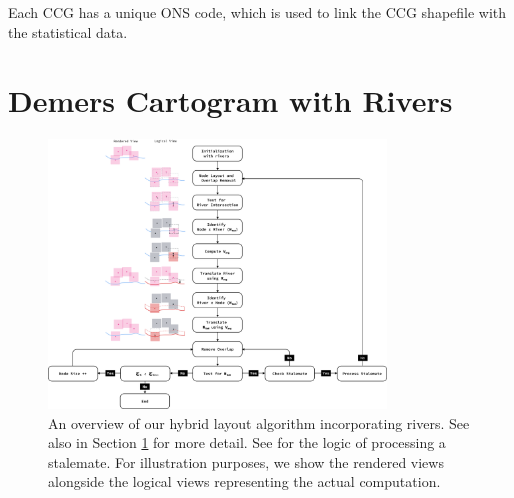 \documentclass[Afour,sagev,times]{sagej}
\begin{document}
Each CCG has a unique ONS code, which is used to link the CCG shapefile with the statistical data.

\section{Demers Cartogram with Rivers}
\label{sec:main}

{
    \begin{figure}[tb!]
        \centering
        \includegraphics[width=0.8\textwidth,height=\textheight,keepaspectratio]{flowchart.png}
        \caption{An overview of our hybrid layout algorithm incorporating rivers.
            See also  in Section \ref{sec:main} for more detail.
            See  for the logic of processing a stalemate.
            For illustration purposes, we show the rendered views alongside the logical views representing the actual computation.}
        \label{fig:flowchart}
    \end{figure}
}
\end{document}
